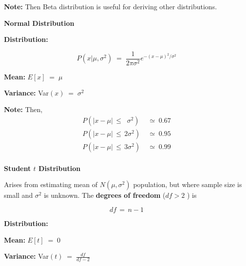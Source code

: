 \documentclass[10pt]{article}
\numberwithin{equation}{section}
\begin{document}
\noindent
\textbf{Note:}  Then Beta distribution is useful for deriving other distributions.


\vspace{3mm}



\noindent
\textbf{Normal Distribution}

\vspace{1mm}

 \noindent
 \textbf{Distribution:}  
 
 \begin{equation}
 P(x | \mu, \sigma^{2} )  \; = \;  \frac{1}{2 \pi \sigma^{2}} e^{-(x-\mu)^{2} / \sigma^{2}}
 \end{equation}
 
 
 \vspace{1mm} 

\noindent
\textbf{Mean:} $E[x] \; = \;  \mu $
 
\noindent
\textbf{Variance:}  Var$(x) \; = \;  \sigma^{2} $

 
 \vspace{1mm} 


\noindent
\textbf{Note:}  Then,
\begin{align}
P( \vert x - \mu \vert \, \leq \; \; \sigma^{2} ) \; & \simeq \;  0.67 \\
P( \vert x - \mu \vert \, \leq \, 2 \sigma^{2} ) \; & \simeq \;  0.95\\
P( \vert x - \mu \vert \, \leq \, 3 \sigma^{2} ) \; & \simeq \;  0.99\\
\end{align}

\vspace{3mm}

\noindent
\textbf{Student $t$ Distribution}

\noindent
Arises from estimating mean of $N(\mu, \sigma^{2})$ population, but where sample size is small and $\sigma^{2}$ is unknown.  The \textbf{degrees of freedom} ($df > 2$ ) is 

$$df \,= \, n-1$$

\vspace{1mm}


 \noindent
 \textbf{Distribution:}  
 
 
 \vspace{1mm} 

\noindent
\textbf{Mean:} $E[t] \; = \;  0  $
 
\noindent
\textbf{Variance:}  Var$(t) \; = \;  \frac{df}{df - 2}$
\end{document}

